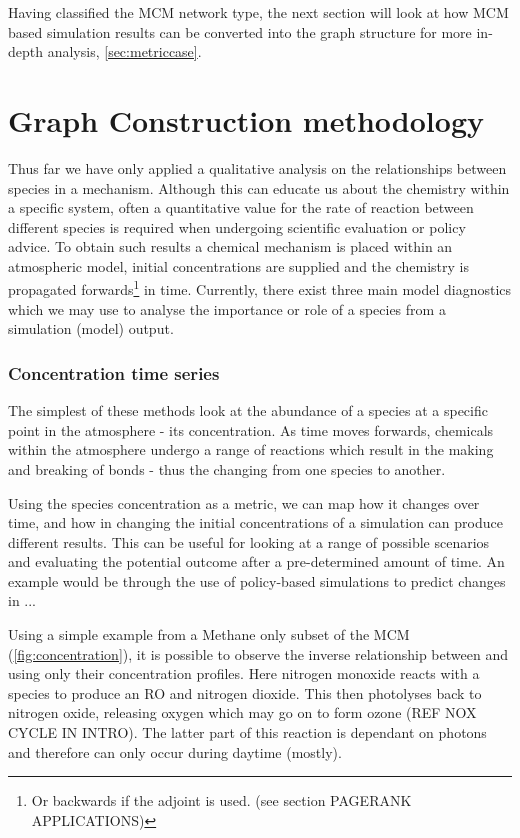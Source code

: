 Having classified the MCM network type, the next section will look at how MCM based simulation results can be converted into the graph structure for more in-depth analysis, \autoref{sec:metriccase}.


\section{Graph Construction methodology }\label{sec:chem}

Thus far we have only applied a qualitative analysis on the relationships between species in a mechanism. Although this can educate us about the chemistry within a specific system, often a quantitative value for the rate of reaction between different species is required when undergoing scientific evaluation or policy advice. To obtain such results a chemical mechanism is placed within an atmospheric model, initial concentrations are supplied and the chemistry is propagated forwards\footnote{Or backwards if the adjoint is used. (see section PAGERANK APPLICATIONS)} in time. Currently, there exist three main model diagnostics which we may use to analyse the importance or role of a species from a simulation (model) output. 


\subsubsection{Concentration time series}

The simplest of these methods look at the abundance of a  species at a specific point in the atmosphere - its concentration. As time moves forwards, chemicals within the atmosphere undergo a range of reactions which result in the making and breaking of bonds - thus the changing from one species to another. 

Using the species concentration as a metric, we can map how it changes over time, and how in changing the initial concentrations of a simulation can produce different results. This can be useful for looking at a range of possible scenarios and evaluating the potential outcome after a pre-determined amount of time. An example would be through the use of policy-based simulations to predict changes in ...

Using a simple example from a Methane only subset of the MCM (\autoref{fig:concentration}), it is possible to observe the inverse relationship between  and  using only their concentration profiles. Here nitrogen monoxide reacts with a  species to produce an RO and nitrogen dioxide.
This then photolyses back to nitrogen oxide, releasing oxygen which may go on to form ozone (REF NOX CYCLE IN INTRO). The latter part of this reaction is dependant on photons and therefore can only occur during daytime (mostly).
 
